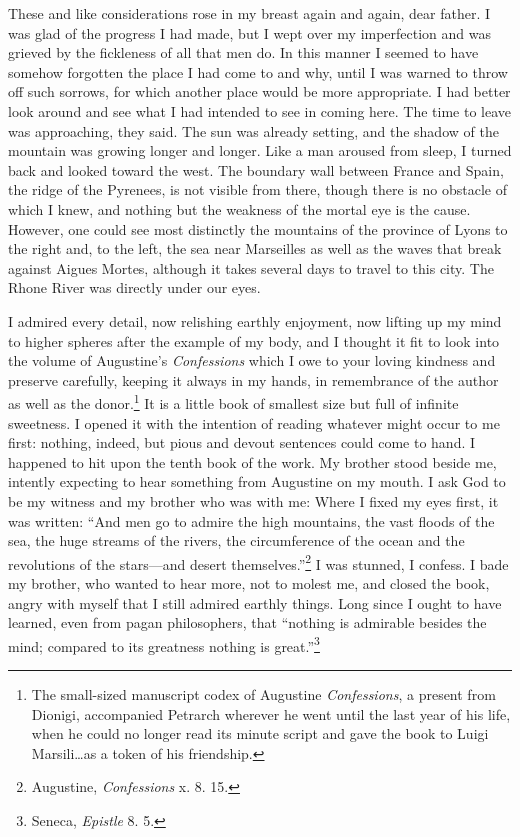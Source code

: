 These and like considerations rose in my breast again and again, dear
father. I was glad of the progress I had made, but I wept over my
imperfection and was grieved by the fickleness of all that men do. In
this manner I seemed to have somehow forgotten the place I had come to
and why, until I was warned to throw off such sorrows, for which
another place would be more appropriate. I had better look around and
see what I had intended to see in coming here. The time to leave was
approaching, they said. The sun was already setting, and the shadow of
the mountain was growing longer and longer. Like a man aroused from
sleep, I turned back and looked toward the west. The boundary wall
between France and Spain, the ridge of the Pyrenees, is not visible
from there, though there is no obstacle of which I knew, and nothing
but the weakness of the mortal eye is the cause. However, one could
see most distinctly the mountains of the province of Lyons to the
right and, to the  left, the sea near Marseilles as well as
the waves that break against Aigues Mortes, although it takes several
days to travel to this city. The Rhone River was directly under our
eyes.

I admired every detail, now relishing earthly enjoyment, now lifting
up my mind to higher spheres after the example of my body, and I
thought it fit to look into the volume of Augustine's
\textit{Confessions} which I owe to your loving kindness and preserve
carefully, keeping it always in my hands, in remembrance of the author
as well as the donor.\footnote{The small-sized manuscript codex of
Augustine \textit{Confessions}, a present from Dionigi, accompanied
Petrarch wherever he went until the last year of his life, when he
could no longer read its minute script and gave the book to Luigi
Marsili\ldots as a token of his friendship.} It is a little book of
smallest size but full of infinite sweetness. I opened it with the
intention of reading whatever might occur to me first: nothing,
indeed, but pious and devout sentences could come to hand. I happened
to hit upon the tenth book of the work. My brother stood beside me,
intently expecting to hear something from Augustine on my mouth. I ask
God to be my witness and my brother who was with me: Where I fixed my
eyes first, it was written: ``And men go to admire the high mountains,
the vast floods of the sea, the huge streams of the rivers, the
circumference of the ocean and the revolutions of the stars---and
desert themselves.''\footnote{Augustine, \textit{Confessions} x. 8.
15.} I was stunned, I confess. I bade my brother, who wanted to hear
more, not to molest me, and closed the book, angry with myself that I
still admired earthly things. Long since I ought to have learned, even
from pagan philosophers, that ``nothing is admirable besides the mind;
compared to its greatness nothing is great.''\footnote{Seneca,
\textit{Epistle} 8. 5.}

